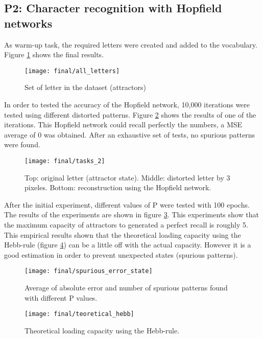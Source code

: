\subsection{P2: Character recognition with Hopfield networks}
As warm-up task, the required letters were created and added to the vocabulary. Figure \ref{all_letter} shows the final results.

\begin{figure}[!htbp]
\caption{Set of letter in the dataset (attractors)}
\label{all_letter}
\texttt{[image: final/all\_letters]}
\centering
\end{figure}

In order to tested the accuracy of the Hopfield network, 10,000 iterations were tested using different distorted patterns. Figure \ref{final_3_1} shows the results of one of the iterations. This Hopfield network could recall perfectly the numbers, a MSE average of 0 was obtained. After an exhaustive set of tests, no spurious patterns were found. 
\bigbreak
\begin{figure}[!htbp]
\caption{Top: original letter (attractor state). Middle: distorted letter by 3 pixeles. Bottom: reconstruction using the Hopfield network.}
\label{final_3_1}
\texttt{[image: final/tasks\_2]}
\centering
\end{figure}

After the initial experiment, different values of P were tested with 100 epochs. The results of the experiments are shown in figure \ref{spurious_error_state}. This experiments show that the maximum capacity of attractors to generated a perfect recall is roughly 5. This empirical results shown that the theoretical loading capacity using the Hebb-rule (figure \ref{teoretical_hebb}) can be a little off with the actual capacity. However it is a good estimation in order to prevent unexpected states (spurious patterns).
\bigbreak

\begin{figure}[!htbp]
\caption{Average of absolute error and number of spurious patterns found with different P values.}
\label{spurious_error_state}
\texttt{[image: final/spurious\_error\_state]}
\centering
\end{figure}

\begin{figure}[!htbp]
\caption{Theoretical loading capacity using the Hebb-rule.}
\label{teoretical_hebb}
\medbreak
\texttt{[image: final/teoretical\_hebb]}
\centering
\end{figure}


